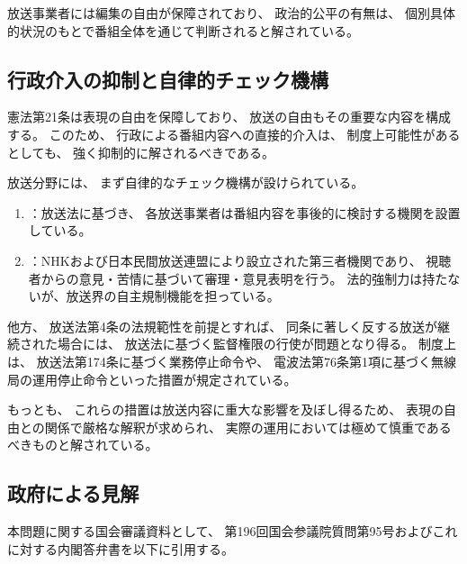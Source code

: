 放送事業者には編集の自由が保障されており、
政治的公平の有無は、
個別具体的状況のもとで番組全体を通じて判断されると解されている。

\subsection{行政介入の抑制と自律的チェック機構}
憲法第21条は表現の自由を保障しており、
放送の自由もその重要な内容を構成する。
このため、
行政による番組内容への直接的介入は、
制度上可能性があるとしても、
強く抑制的に解されるべきである。

放送分野には、
まず自律的なチェック機構が設けられている。

\begin{enumerate}
  \item {}：放送法に基づき、
  各放送事業者は番組内容を事後的に検討する機関を設置している。
  \item {}：NHKおよび日本民間放送連盟により設立された第三者機関であり、
  視聴者からの意見・苦情に基づいて審理・意見表明を行う。
  法的強制力は持たないが、放送界の自主規制機能を担っている。
\end{enumerate}

他方、
放送法第4条の法規範性を前提とすれば、
同条に著しく反する放送が継続された場合には、
放送法に基づく監督権限の行使が問題となり得る。
制度上は、
放送法第174条に基づく業務停止命令や、
電波法第76条第1項に基づく無線局の運用停止命令といった措置が規定されている。

もっとも、
これらの措置は放送内容に重大な影響を及ぼし得るため、
表現の自由との関係で厳格な解釈が求められ、
実際の運用においては極めて慎重であるべきものと解されている。

\subsection{政府による見解}
本問題に関する国会審議資料として、
第196回国会参議院質問第95号およびこれに対する内閣答弁書を以下に引用する。

